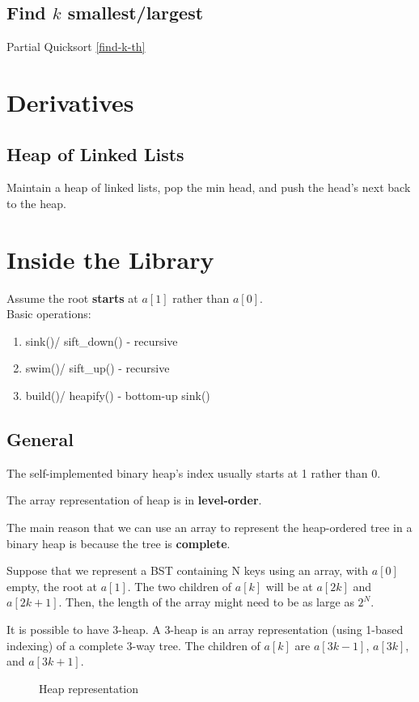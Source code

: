\subsection{Find $k$ smallest/largest}
Partial Quicksort \ref{find-k-th}

\section{Derivatives}
\subsection{Heap of Linked Lists}
Maintain a heap of linked lists, pop the min head, and push the head's next back to the heap. 

\section{Inside the Library}
Assume the root \textbf{starts} at $a[1]$ rather than $a[0]$.
\\
Basic operations:
\begin{enumerate}
\item sink()/ sift\_down() - recursive
\item swim()/ sift\_up() - recursive
\item build()/ heapify() - bottom-up sink()
\end{enumerate}
\subsection{General}
The self-implemented binary heap's index usually starts at 1 rather than 0. 

The array representation of heap is in \textbf{level-order}.

The main reason that we can use an array to represent the heap-ordered tree in a binary heap is because the tree is \textbf{complete}.

Suppose that we represent a BST containing N keys using an array, with $a[0]$ empty, the root at $a[1]$. The two children of $a[k]$ will be at $a[2k]$ and $a[2k+1]$. Then, the length of the array might need to be as large as $2^N$.

It is possible to have 3-heap. A 3-heap is an array representation (using 1-based indexing) of a complete 3-way tree.
The children of $a[k]$ are $a[3k-1]$, $a[3k]$, and $a[3k+1]$.
\begin{figure}[hbtp]
\centering
{}
\caption{Heap representation}
\label{fig:heap} 
\end{figure}


